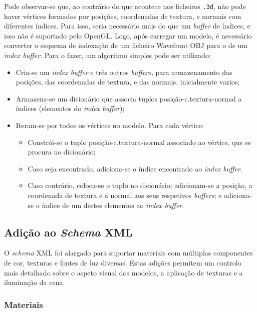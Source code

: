 \documentclass[12pt, a4paper]{article}
\begin{document}
Pode observar-se que, ao contrário do que acontece nos ficheiros \texttt{.3d}, não pode haver
vértices formados por posições, coordenadas de textura, e normais com diferentes índices. Para isso,
seria necessário mais do que um \emph{buffer} de índices, e isso não é suportado pelo OpenGL. Logo,
após carregar um modelo, é necessário converter o esquema de indexação de um ficheiro Wavefront OBJ
para o de um \emph{index buffer}. Para o fazer, um algoritmo simples pode ser utilizado:

\begin{itemize}
    \item Cria-se um \emph{index buffer} e três outros \emph{buffers}, para armazenamento das
        posições, das coordenadas de textura, e das normais, inicialmente vazios;

    \item Armazena-se um dicionário que associa tuplos posição-c.textura-normal a índices (elementos
        do \emph{index buffer});

    \item Iteram-se por todos os vértices no modelo. Para cada vértice:
        \begin{itemize}
            \item Constrói-se o tuplo posição-c.textura-normal associado ao vértice, que se procura
                no dicionário;
            \item Caso seja encontrado, adiciona-se o índice encontrado ao \emph{index buffer}.
            \item Caso contrário, coloca-se o tuplo no dicionário; adicionam-se a posição, a
                coordenada de textura e a normal aos seus respetivos \emph{buffers}; e adiciona-se o
                índice de um destes elementos ao \emph{index buffer}.
        \end{itemize}
\end{itemize}

\subsection{Adição ao \emph{Schema} XML}

O \emph{schema} XML foi alargado para suportar materiais com múltiplas componentes de cor, texturas
e fontes de luz diversas. Estas adições permitem um controlo mais detalhado sobre o aspeto visual
dos modelos, a aplicação de texturas e a iluminação da cena.

\subsubsection{Materiais}
\end{document}
